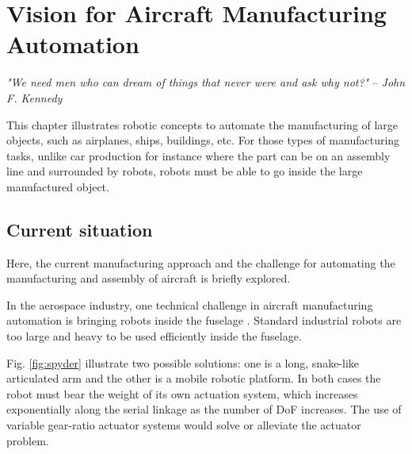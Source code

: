 \chapter{Vision for Aircraft Manufacturing Automation}
\label{sec:VisionForAircraftManufacturingAutomation}

\begin{flushright}
{
\textit{"We need men who can dream of things that never were and ask why not?"}
  -- \emph{John F. Kennedy}
%
}
\end{flushright}
\vspace{+10pt}

This chapter illustrates robotic concepts to automate the manufacturing of large objects, such as airplanes, ships, buildings, etc. For those types of manufacturing tasks, unlike car production for instance where the part can be on an assembly line and surrounded by robots, robots must be able to go inside the large manufactured object. %


\section{Current situation}
\label{sec:CurrentSituation}

Here, the current manufacturing approach and the challenge for automating the manufacturing and assembly of aircraft is briefly explored.

In the aerospace industry, one technical challenge in aircraft manufacturing automation is bringing robots inside the fuselage . Standard industrial robots are too large and heavy to be used efficiently inside the fuselage. 

Fig. \ref{fig:spyder} illustrate two possible solutions: one is a long, snake-like articulated arm \cite{buckingham_r._chitrakaran_v._conkie_r._ferguson_g._et_al._snake-arm_2007} and the other is a mobile robotic platform. In both cases the robot must bear the weight of its own actuation system, which increases exponentially along the serial linkage as the number of DoF increases. The use of variable gear-ratio actuator systems would solve or alleviate the actuator problem. 

